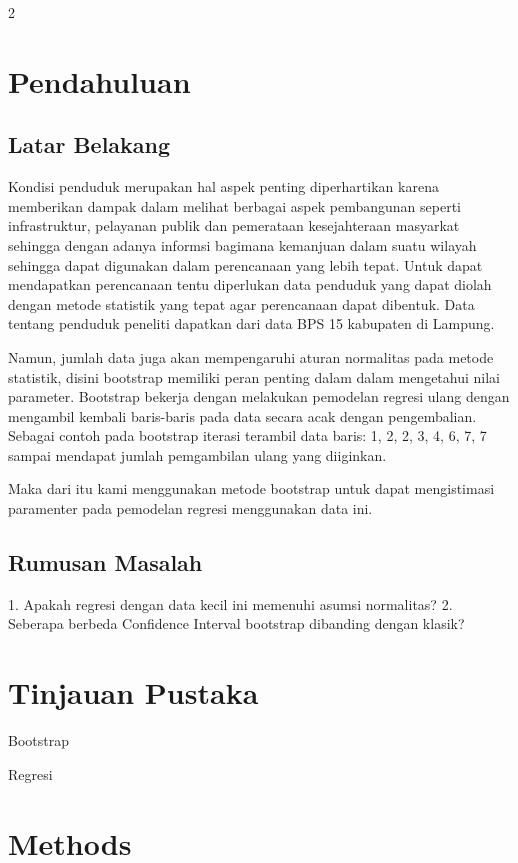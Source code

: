 \documentclass[12pt,a4paper]{article}
\begin{document}
\begin{multicols}{2}
	\section{Pendahuluan}
	\subsection{Latar Belakang}
	Kondisi penduduk merupakan hal aspek penting diperhartikan karena memberikan dampak
	dalam melihat berbagai aspek pembangunan seperti infrastruktur, pelayanan publik
	dan pemerataan kesejahteraan masyarkat sehingga dengan adanya informsi bagimana kemanjuan dalam suatu wilayah sehingga dapat digunakan
	dalam perencanaan yang lebih tepat.\parencite{agung2026} Untuk dapat mendapatkan
	perencanaan tentu diperlukan data penduduk yang dapat diolah dengan metode
	statistik yang tepat agar perencanaan dapat dibentuk. Data tentang penduduk
	peneliti dapatkan dari data BPS 15 kabupaten di Lampung.

	Namun, jumlah data juga akan mempengaruhi aturan normalitas pada
	metode statistik, disini bootstrap memiliki peran penting dalam
	dalam mengetahui nilai parameter. Bootstrap bekerja dengan melakukan pemodelan regresi
	ulang dengan mengambil kembali baris-baris pada data secara acak dengan pengembalian.
	Sebagai contoh pada bootstrap iterasi terambil data baris: 1, 2, 2, 3, 4, 6, 7, 7 sampai
	mendapat jumlah pemgambilan ulang yang diiginkan.

	Maka dari itu kami menggunakan metode bootstrap untuk dapat mengistimasi paramenter
	pada pemodelan regresi menggunakan data ini.

	\subsection{Rumusan Masalah}
	1. Apakah regresi dengan data kecil ini memenuhi asumsi normalitas?
	2. Seberapa berbeda Confidence Interval bootstrap dibanding dengan klasik?


	\section{Tinjauan Pustaka}
	Bootstrap


	Regresi
	\section{Methods}


\end{multicols}
\end{document}
